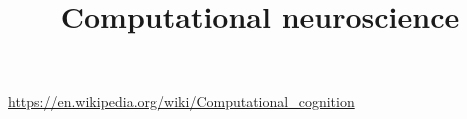 \documentclass[a4paper]{article}
\title{Computational neuroscience}
\date{}
\begin{document}
    \maketitle
    \url{https://en.wikipedia.org/wiki/Computational_cognition}
    
\end{document}
